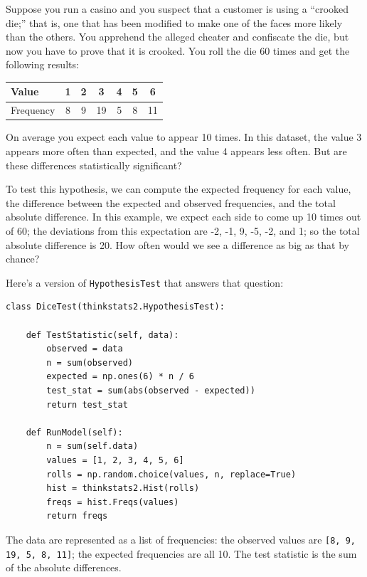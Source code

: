 \documentclass[12pt]{book}
\begin{document}
Suppose you run a casino and you suspect that a customer is
using a ``crooked die;'' that
is, one that has been modified to make one of the faces more
likely than the others.  You apprehend the alleged
cheater and confiscate the die, but now you have to prove that it
is crooked.  You roll the die 60 times and get the following results:

\begin{center}
\begin{tabular}{|l|c|c|c|c|c|c|}
\hline
Value     &  1  &  2  &  3  &  4  &  5  &  6  \\ 
\hline
Frequency &  8  &  9  &  19  &  5  &  8  &  11  \\
\hline
\end{tabular}
\end{center}

On average you expect each value to appear 10 times.  In this
dataset, the value 3 appears more often than expected, and the value 4
appears less often.  But are these differences statistically
significant?

To test this hypothesis, we can compute the expected frequency for
each value, the difference between the expected and observed
frequencies, and the total absolute difference.  In this
example, we expect each side to come up 10 times out of 60; the
deviations from this expectation are -2, -1, 9, -5, -2, and 1; so the
total absolute difference is 20.  How often would we see a
difference as big as that by chance?

Here's a version of {\tt HypothesisTest} that answers that question:

\begin{verbatim}
class DiceTest(thinkstats2.HypothesisTest):

    def TestStatistic(self, data):
        observed = data
        n = sum(observed)
        expected = np.ones(6) * n / 6
        test_stat = sum(abs(observed - expected))
        return test_stat

    def RunModel(self):
        n = sum(self.data)
        values = [1, 2, 3, 4, 5, 6]
        rolls = np.random.choice(values, n, replace=True)
        hist = thinkstats2.Hist(rolls)
        freqs = hist.Freqs(values)
        return freqs
\end{verbatim}

The data are represented as a list of frequencies: the observed
values are {\tt [8, 9, 19, 5, 8, 11]}; the expected frequencies
are all 10.  The test statistic is the sum of the absolute differences.
\end{document}
